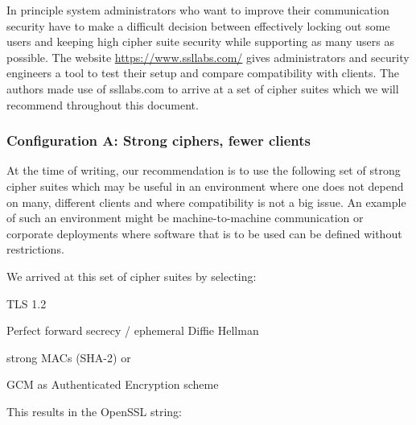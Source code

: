 
In principle system administrators who want to improve their communication security
have to make a difficult decision between effectively locking out some users and
keeping high cipher suite security while supporting as many users as possible.
The website \url{https://www.ssllabs.com/} gives administrators and security engineers
a tool to test their setup and compare compatibility with clients. The authors made
use of ssllabs.com to arrive at a set of cipher suites which we will recommend
throughout this document.



\subsubsection{Configuration A: Strong ciphers, fewer clients}

At the time of writing, our recommendation is to use the following set of strong cipher
suites which may be useful in an environment where one does not depend on many,
different clients and where compatibility is not a big issue.  An example
of such an environment might be machine-to-machine communication or corporate
deployments where software that is to be used can be defined without restrictions.


We arrived at this set of cipher suites by selecting:

\begin{itemize*}
  \item TLS 1.2
  \item Perfect forward secrecy / ephemeral Diffie Hellman
  \item strong MACs (SHA-2) or
  \item GCM as Authenticated Encryption scheme
\end{itemize*}

This results in the OpenSSL string:

%



